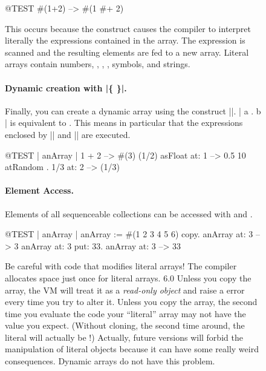 \documentclass[a4paper,10pt,twoside]{book}
\begin{document}
\begin{figure}
\begin{center}
\begin{code}{@TEST}
#(1+2) -->  #(1 #+ 2)
\end{code}

\noindent
This occurs because the construct \ct{#()} causes the compiler to interpret literally the expressions contained in the array.
The expression is scanned and the resulting elements are fed to a new array.
Literal arrays contain numbers, , , , symbols, and strings.

\paragraph{Dynamic creation with \ct|\{ \}|.}
Finally, you can create a dynamic array using the construct \ct|{}|.
\ct|{ a . b }| is equivalent to .
This means in particular that the expressions enclosed by \ct|{| and \ct|}| are executed. 

\begin{code}{@TEST | anArray |}
{ 1 + 2 } --> #(3)
{(1/2) asFloat} at: 1 --> 0.5
{10 atRandom . 1/3} at: 2 --> (1/3)
\end{code}

\paragraph{Element Access.}
Elements of all sequenceable collections can be accessed with  and .

\begin{code}{@TEST | anArray |}
anArray := #(1 2 3 4 5 6) copy.
anArray at: 3 --> 3
anArray at: 3 put: 33.
anArray at: 3 --> 33
\end{code}

\noindent
Be careful with code that modifies literal arrays!
The compiler allocates space just once for literal arrays.
\SqVersionSwitch
{6.0}{
  Unless you copy the array, the VM will treat it as a \emph{read-only object} and raise a  error every time you try to alter it.
}{
  Unless you copy the array, the second time you evaluate the code your ``literal'' array may not have the value you expect.
  (Without cloning, the second time around, the literal  will actually be !)
  Actually, future \sq versions will forbid the manipulation of literal objects because it can have some really weird consequences.
}
Dynamic arrays do not have this problem.


\end{center}
\end{figure}
\end{document}
